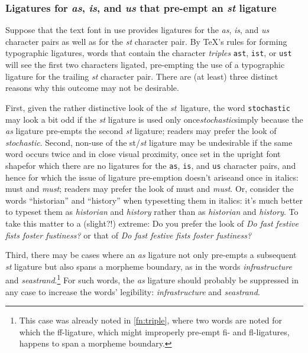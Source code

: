 \documentclass[11pt]{article}
\newcommand{\opt}[1]{\texttt{#1}}
\begin{document}
\subsubsection*{Ligatures for \emph{as}, \emph{is}, and \emph{us} that pre-empt an \emph{st} ligature}

Suppose that the text font in use provides ligatures for the \emph{as}, \emph{is}, and \emph{us} character pairs as well as for the \emph{st} character pair. By \TeX's rules for forming typographic ligatures, words that contain the character \emph{triples} \opt{ast}, \opt{ist}, or \opt{ust} will see the first two characters ligated, pre-empting the use of a typographic ligature for the trailing \emph{st} character pair. There are (at least) three distinct reasons why this outcome may not be desirable.

First, given the rather distinctive look of the \emph{st}~ligature, the word \opt{stochastic} may look a bit odd if the \emph{st} ligature is used only once\textemdash\emph{stoch\mbox{as}tic}\textemdash simply because the \emph{as} ligature pre-empts the second \emph{st} ligature; readers may prefer the look of \emph{stocha\mbox{st}ic}. Second, non-use of the st/\emph{st} ligature may be undesirable if the same word occurs twice and in close visual proximity, once set in the upright font shape\textemdash for which there are no ligatures for the \opt{as}, \opt{is}, and \opt{us} character pairs, and hence for which the issue of ligature pre-emption doesn't arise\textemdash and once in italics: must and \emph{m\mbox{us}t}; readers may prefer the look of must and \emph{mu\mbox{st}}. Or, consider the words \enquote{historian} and \enquote{history} when typesetting them in italics: it's much better to typeset them as \emph{historian} and \emph{history} rather than as \emph{h\mbox{is}torian} and \emph{h\mbox{is}tory}. To take this matter to a (slight?!) extreme: Do you prefer the look of \emph{Do f\mbox{as}t festive f\mbox{is}ts foster f\mbox{us}tiness?} or that of \emph{Do fa\mbox{st} festive fi\mbox{st}s foster fu\mbox{st}iness?}

Third, there may be cases where an \emph{as} ligature not only pre-empts a subsequent \emph{st} ligature but also spans a morpheme boundary, as in the words \emph{infr\mbox{as}tructure} and \emph{se\mbox{as}trand}.\footnote{This case was already noted in \cref{fn:triple}, where two words are noted for which the ff-ligature, which might improperly pre-empt fi- and fl-ligatures, happens to span a morpheme boundary.} For such words, the \emph{as} ligature should probably be suppressed in any case to increase the words' legibility: \emph{infra\mbox{st}ructure} and \emph{sea\mbox{st}rand}.
\end{document}
